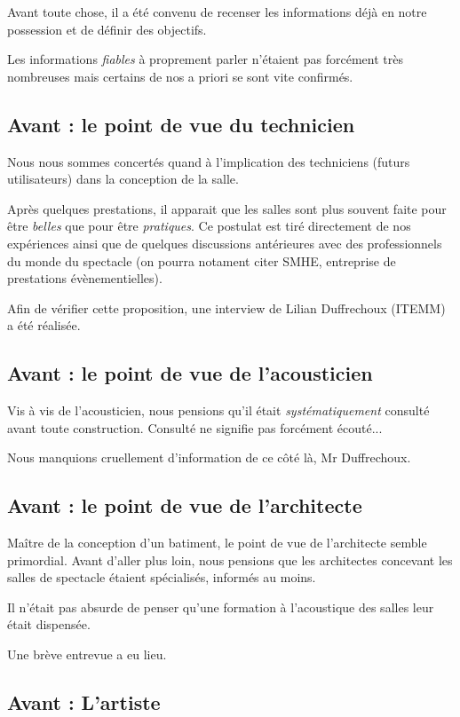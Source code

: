 \documentclass[a4paper, 11pt]{report}
\begin{document}
Avant toute chose, il a été convenu de recenser les informations déjà en notre possession et de définir des objectifs.

Les informations {\em fiables} à proprement parler n'étaient pas forcément très nombreuses mais certains de nos a priori se sont vite confirmés.

\subsection{Avant : le point de vue du technicien}

Nous nous sommes concertés quand à l'implication des techniciens (futurs utilisateurs) dans la conception de la salle.

Après quelques prestations, il apparait que les salles sont plus souvent faite pour être {\em belles} que pour être {\em pratiques}.
Ce postulat est tiré directement de nos expériences ainsi que de quelques discussions antérieures avec des professionnels du monde du spectacle (on pourra notament citer SMHE, entreprise de prestations évènementielles).

Afin de vérifier cette proposition, une interview de Lilian {\sc Duffrechoux} (ITEMM) a été réalisée.

\subsection{Avant : le point de vue de l'acousticien}

Vis à vis de l'acousticien, nous pensions qu'il était {\em systématiquement} consulté avant toute construction.
Consulté ne signifie pas forcément écouté...

Nous manquions cruellement d'information de ce côté là, Mr {\sc Duffrechoux}.

\subsection{Avant : le point de vue de l'architecte}

Maître de la conception d'un batiment, le point de vue de l'architecte semble primordial.
Avant d'aller plus loin, nous pensions que les architectes concevant les salles de spectacle étaient spécialisés, informés au moins.

Il n'était pas absurde de penser qu'une formation à l'acoustique des salles leur était dispensée.

Une brève entrevue a eu lieu.

\subsection{Avant : L'artiste}
\end{document}

